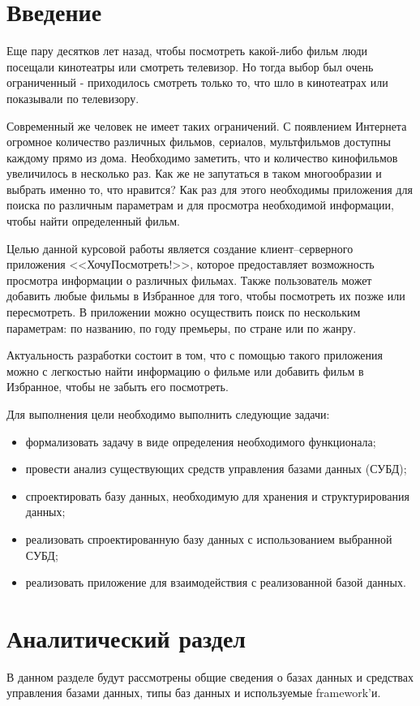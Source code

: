 \documentclass[a4paper, 14pt]{article}
\begin{document}
	\newpage
	\section*{Введение}
	Еще пару десятков лет назад, чтобы посмотреть какой-либо фильм люди посещали кинотеатры или смотреть телевизор. Но тогда выбор был очень ограниченный - приходилось смотреть только то, что шло в кинотеатрах или показывали по телевизору.
	
	Современный же человек не имеет таких ограничений. С появлением Интернета огромное количество различных фильмов, сериалов, мультфильмов доступны каждому прямо из дома. Необходимо заметить, что и количество кинофильмов увеличилось в несколько раз. Как же не запутаться в таком многообразии и выбрать именно то, что нравится? Как раз для этого необходимы приложения для поиска по различным параметрам и для просмотра необходимой информации, чтобы найти определенный фильм.
	
	\hfill \break
	
	Целью данной курсовой работы является создание клиент–серверного приложения <<ХочуПосмотреть!>>, которое предоставляет возможность просмотра информации о различных фильмах. Также пользователь может добавить любые фильмы в Избранное для того, чтобы посмотреть их позже или пересмотреть. В приложении можно осуществить поиск по нескольким параметрам: по названию, по году премьеры, по стране или по жанру.
	
	Актуальность разработки состоит в том, что с помощью такого приложения можно с легкостью найти информацию о фильме или добавить фильм в Избранное, чтобы не забыть его посмотреть.
	
	Для выполнения цели необходимо выполнить следующие задачи:
	\begin{itemize}
		\item формализовать задачу в виде определения необходимого функционала;
		\item провести анализ существующих средств управления базами данных (СУБД);
		\item спроектировать базу данных, необходимую для хранения и структурирования данных;
		\item реализовать спроектированную базу данных с использованием выбранной СУБД;
		\item реализовать приложение для взаимодействия с реализованной базой данных.
	\end{itemize}
	\newpage
	
	\section{Аналитический раздел}
	В данном разделе будут рассмотрены общие сведения о базах данных и средствах управления базами данных, типы баз данных и используемые framework'и. 
	
\end{document}
